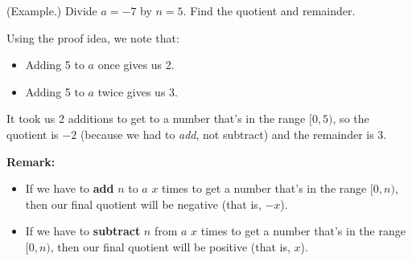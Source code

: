 \documentclass[letterpaper]{article}
\begin{document}
\begin{mdframed}
    (Example.) Divide $a = -7$ by $n = 5$. Find the quotient and remainder.

    \bigskip 

    Using the proof idea, we note that: 
    \begin{itemize}
        \item Adding 5 to $a$ once gives us 2.
        \item Adding 5 to $a$ twice gives us 3. 
    \end{itemize}
    It took us 2 additions to get to a number that's in the range $[0, 5)$, so the quotient is $\boxed{-2}$ (because we had to \emph{add}, not subtract) and the remainder is $\boxed{3}$. 
\end{mdframed}

\textbf{Remark:} 
\begin{itemize}
    \item If we have to \textbf{add} $n$ to $a$ $x$ times to get a number that's in the range $[0, n)$, then our final quotient will be negative (that is, $-x$).
    \item If we have to \textbf{subtract} $n$ from $a$ $x$ times to get a number that's in the range $[0, n)$, then our final quotient will be positive (that is, $x$).
\end{itemize}
\end{document}
